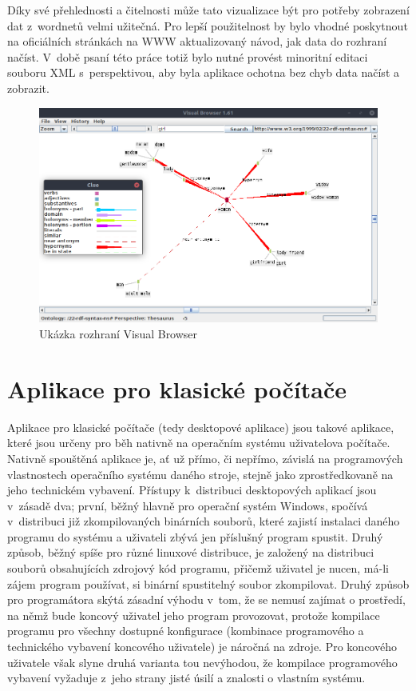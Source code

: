 \documentclass[a4paper, 11pt, oneside, showtrims]{book}
\begin{document}
					Díky své přehlednosti a čitelnosti může tato vizualizace být pro potřeby zobrazení dat z~wordnetů velmi užitečná. Pro lepší použitelnost by bylo vhodné poskytnout na oficiálních stránkách na WWW aktualizovaný návod, jak data do rozhraní načíst. V~době psaní této práce totiž bylo nutné provést minoritní editaci souboru XML s~perspektivou, aby byla aplikace ochotna bez chyb data načíst a zobrazit.

					\begin{figure}[h]
						\centering
						\includegraphics[width=1.0\textwidth]{visualbrowser.png}
						\caption{Ukázka rozhraní Visual Browser}
						\label{fig:visualbrowser}
					\end{figure} 

			\section{Aplikace pro klasické počítače}

			Aplikace pro klasické počítače (tedy desktopové aplikace) jsou takové aplikace, které jsou určeny pro běh nativně na operačním systému uživatelova počítače. Nativně spouštěná aplikace je, ať už přímo, či nepřímo, závislá na programových vlastnostech operačního systému daného stroje, stejně jako zprostředkovaně na jeho technickém vybavení. Přístupy k~distribuci desktopových aplikací jsou v~zásadě dva; první, běžný hlavně pro operační systém Windows, spočívá v~distribuci již zkompilovaných binárních souborů, které zajistí instalaci daného programu do systému a uživateli zbývá jen příslušný program spustit. Druhý způsob, běžný spíše pro různé linuxové distribuce, je založený na distribuci souborů obsahujících zdrojový kód programu, přičemž uživatel je nucen, má-li zájem program používat, si binární spustitelný soubor zkompilovat. Druhý způsob pro programátora skýtá zásadní výhodu v~tom, že se nemusí zajímat o prostředí, na němž bude koncový uživatel jeho program provozovat, protože kompilace programu pro všechny dostupné konfigurace (kombinace programového a technického vybavení koncového uživatele) je náročná na zdroje. \parencite{Elizabeth2015} Pro koncového uživatele však slyne druhá varianta tou nevýhodou, že kompilace programového vybavení vyžaduje z~jeho strany jisté úsilí a znalosti o vlastním systému. 
\end{document}
